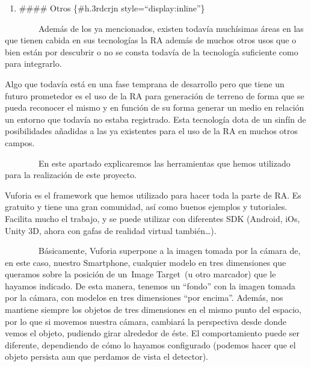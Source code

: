 \begin{enumerate}
\def\labelenumi{\arabic{enumi}.}
\setcounter{enumi}{3}
\itemsep1pt\parskip0pt
\item
  \#\#\#\# Otros \{\#h.3rdcrjn style=``display:inline''\}
\end{enumerate}

~~~~~~~~Además de los ya mencionados, existen todavía muchísimas áreas
en las que tienen cabida en sus tecnologías la RA además de muchos otros
usos que o bien están por descubrir o no se consta todavía de la
tecnología suficiente como para integrarlo.

Algo que todavía está en una fase temprana de desarrollo pero que tiene
un futuro prometedor es el uso de la RA para generación de terreno de
forma que se pueda reconocer el mismo y en función de su forma generar
un medio en relación un entorno que todavía no estaba registrado. Esta
tecnología dota de un sinfín de posibilidades añadidas a las ya
existentes para el uso de la RA en muchos otros campos.


~~~~~~~~En este apartado explicaremos las herramientas que hemos
utilizado para la realización de este proyecto.


Vuforia es el framework que hemos utilizado para hacer toda la parte de
RA. Es gratuito y tiene una gran comunidad, así como buenos ejemplos y
tutoriales. Facilita mucho el trabajo, y se puede utilizar con
diferentes SDK (Android, iOs, Unity 3D, ahora con gafas de realidad
virtual también\ldots{}).


~~~~~~~~Básicamente, Vuforia superpone a la imagen tomada por la cámara
de, en este caso, nuestro Smartphone, cualquier modelo en tres
dimensiones que queramos sobre la posición de un~Image Target~(u otro
marcador) que le hayamos indicado. De esta manera, tenemos un ``fondo''
con la imagen tomada por la cámara, con modelos en tres dimensiones
``por encima''. Además, nos mantiene siempre los objetos de tres
dimensiones en el mismo punto del espacio, por lo que si movemos nuestra
cámara, cambiará la perspectiva desde donde vemos el objeto, pudiendo
girar alrededor de éste. El comportamiento puede ser diferente,
dependiendo de cómo lo hayamos configurado (podemos hacer que el objeto
persista aun que perdamos de vista el detector).

